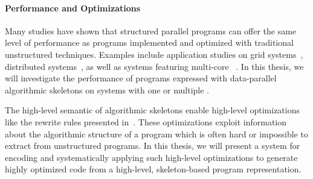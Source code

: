 \paragraph{Performance and Optimizations}
Many studies have shown that structured parallel programs can offer the same level of performance as programs implemented and optimized with traditional unstructured techniques.
Examples include application studies on grid systems~\cite{Alt2007}, distributed systems~\cite{CiechanowiczKSGK09}, as well as systems featuring multi-core \CPUs~\cite{AldinucciMT10}.
In this thesis, we will investigate the performance of programs expressed with data-parallel algorithmic skeletons on systems with one or multiple \GPUs.

The high-level semantic of algorithmic skeletons enable high-level optimizations like the rewrite rules presented in~\cite{Gorlatch00}.
These optimizations exploit information about the algorithmic structure of a program which is often hard or impossible to extract from unstructured programs.
In this thesis, we will present a system for encoding and systematically applying such high-level optimizations to generate highly optimized code from a high-level, skeleton-based program representation.


